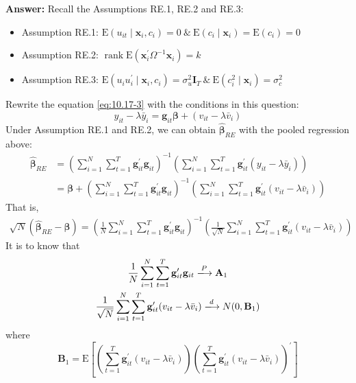 \begin{enumerate}
\begin{enumerate}
        \textbf{Answer:} Recall the Assumptions RE.1, RE.2 and RE.3:
        \begin{itemize}
            \item Assumption RE.1: $\mathrm{E}(u_{it} \mid \mathbf{x}_i,c_i) = 0\ \&\ \mathrm{E}(c_i \mid \mathbf{x}_i) = \mathrm{E}(c_i) = 0$
            \item Assumption RE.2: $\operatorname{rank} \mathrm{E}\left( \mathbf{x}_i^\prime \Omega^{-1} \mathbf{x}_i \right) = k$
            \item Assumption RE.3: $\mathrm{E}(u_i u_i^\prime \mid \mathbf{x}_i,c_i) = \sigma_u^2 \mathbf{I}_T \ \&\ \mathrm{E}(c_i^2 \mid \mathbf{x}_i) = \sigma_c^2$
        \end{itemize}
        Rewrite the equation \eqref{eq:10.17-3} with the conditions in this question: 
        \[ y_{it}-\lambda \bar{y}_{i}= \mathbf{g}_{it}\bm{\beta} +\left(v_{i t}-\lambda \bar{v}_{i}\right) \]
        Under Assumption RE.1 and RE.2, we can obtain $\hat{\bm{\beta}}_{RE}$ with the pooled regression above:
        \begin{align*}
            \hat{\bm{\beta}}_{RE} &= \left( \sum_{i=1}^N \sum_{t=1}^T \mathbf{g}_{it}^\prime \mathbf{g}_{it} \right)^{-1} \left( \sum_{i=1}^N \sum_{t=1}^T \mathbf{g}_{it}^\prime (y_{it} - \lambda\bar{y}_i) \right) \\
            &= \bm{\beta} + \left( \sum_{i=1}^N \sum_{t=1}^T \mathbf{g}_{it}^\prime \mathbf{g}_{it} \right)^{-1} \left( \sum_{i=1}^N \sum_{t=1}^T \mathbf{g}_{it}^\prime (v_{i t}-\lambda \bar{v}_{i}) \right)
        \end{align*}
        That is,
        \begin{gather}
            \sqrt{N}\left( \hat{\bm{\beta}}_{RE} - \bm{\beta} \right) = \left( \frac{1}{N} \sum_{i=1}^N \sum_{t=1}^T \mathbf{g}_{it}^\prime \mathbf{g}_{it} \right)^{-1} \left( \frac{1}{\sqrt{N}}\sum_{i=1}^N \sum_{t=1}^T \mathbf{g}_{it}^\prime (v_{i t}-\lambda \bar{v}_{i}) \right) \label{eq:10.17-4}
        \end{gather}
        It is to know that
        \begin{gather*}
            \frac{1}{N} \sum_{i=1}^N \sum_{t=1}^T \mathbf{g}_{it}^\prime \mathbf{g}_{it} \xlongrightarrow{P} \mathbf{A}_1 \\
            \frac{1}{\sqrt{N}}\sum_{i=1}^N \sum_{t=1}^T \mathbf{g}_{it}^\prime (v_{i t}-\lambda \bar{v}_{i}) \xlongrightarrow{d} N(0,\mathbf{B}_1)
        \end{gather*}
        where
        \[ \mathbf{B}_1 = \mathrm{E}\left[ \left( \sum_{t=1}^T \mathbf{g}_{it}^\prime (v_{i t}-\lambda \bar{v}_{i}) \right)  \left( \sum_{t=1}^T \mathbf{g}_{it}^\prime (v_{i t}-\lambda \bar{v}_{i}) \right)^\prime \right] \]

\end{enumerate}
\end{enumerate}
